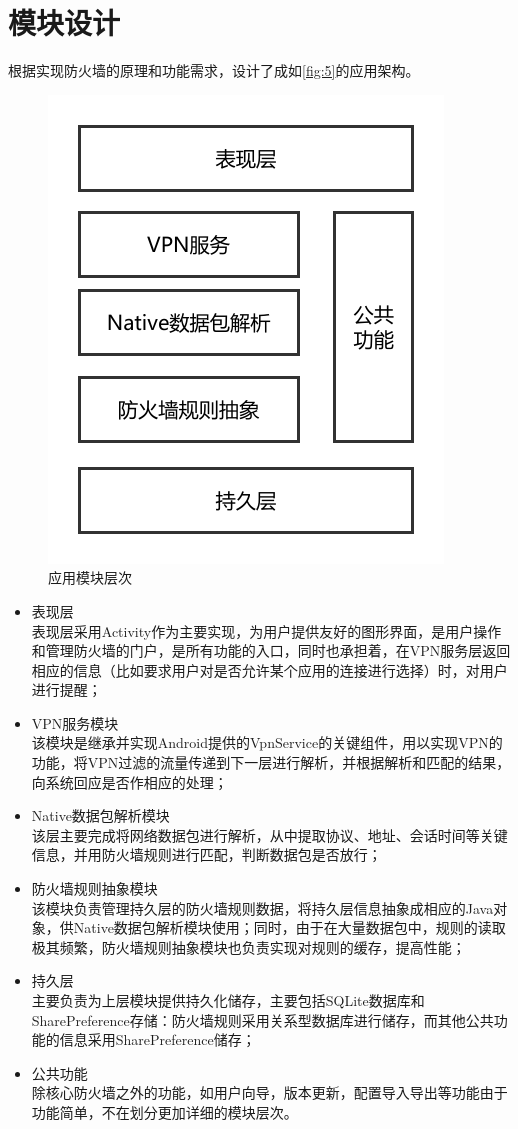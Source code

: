 \documentclass[format=final, language=chinese, degree=bachelor]{hustthesis}
\begin{document}
\section{模块设计}

根据实现防火墙的原理和功能需求，设计了成如\autoref{fig:5}的应用架构。

\begin{figure}[!h]
\centering
\includegraphics[width=.6\textwidth]{modules.pdf}
\caption{应用模块层次}\label{fig:5}
\end{figure}

\begin{itemize}
	\item 表现层\\ 表现层采用Activity作为主要实现，为用户提供友好的图形界面，是用户操作和管理防火墙的门户，是所有功能的入口，同时也承担着，在VPN服务层返回相应的信息（比如要求用户对是否允许某个应用的连接进行选择）时，对用户进行提醒；
	\item VPN服务模块\\该模块是继承并实现Android提供的VpnService的关键组件，用以实现VPN的功能，将VPN过滤的流量传递到下一层进行解析，并根据解析和匹配的结果，向系统回应是否作相应的处理；
	\item Native数据包解析模块\\该层主要完成将网络数据包进行解析，从中提取协议、地址、会话时间等关键信息，并用防火墙规则进行匹配，判断数据包是否放行；
	\item 防火墙规则抽象模块\\该模块负责管理持久层的防火墙规则数据，将持久层信息抽象成相应的Java对象，供Native数据包解析模块使用；同时，由于在大量数据包中，规则的读取极其频繁，防火墙规则抽象模块也负责实现对规则的缓存，提高性能；
	\item 持久层\\主要负责为上层模块提供持久化储存，主要包括SQLite数据库和SharePreference存储：防火墙规则采用关系型数据库进行储存，而其他公共功能的信息采用SharePreference储存；
	\item 公共功能\\除核心防火墙之外的功能，如用户向导，版本更新，配置导入导出等功能由于功能简单，不在划分更加详细的模块层次。
\end{itemize}
\end{document}
